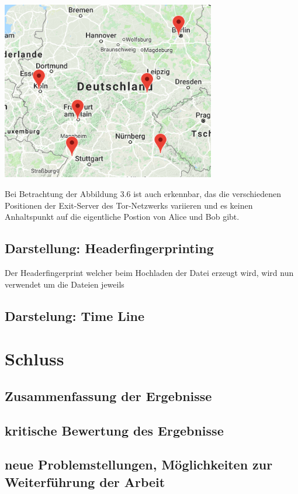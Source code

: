 \documentclass[
    fontsize=12pt,
    headings=small,
    parskip=half,           %
    bibliography=totoc,
    numbers=noenddot,       %
    open=any,               %
    ]{scrreprt}
\begin{document}
\begin{center}
\includegraphics[width=0.7\textwidth]{../pic/IP-Tor-SetB.png}\\
\end{center}

Bei Betrachtung der Abbildung 3.6 ist auch erkennbar, das die verschiedenen Positionen der Exit-Server des Tor-Netzwerks variieren und es keinen Anhaltspunkt auf die eigentliche Postion von Alice und Bob gibt. 


\newpage
\section{Darstellung: Headerfingerprinting}

Der Headerfingerprint welcher beim Hochladen der Datei erzeugt wird, wird nun verwendet um die Dateien jeweils  

\newpage
\section{Darstelung: Time Line}
\chapter{Schluss}
\section{Zusammenfassung der Ergebnisse}
\section{kritische Bewertung des Ergebnisse}
\section{neue Problemstellungen, Möglichkeiten zur Weiterführung der Arbeit}
\end{document}

